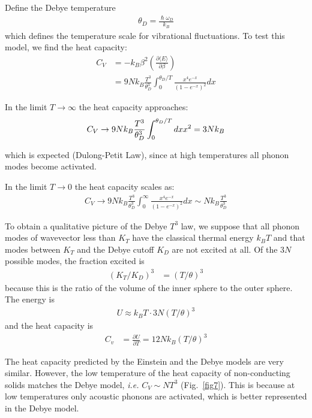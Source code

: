 \documentclass[book.tex]{subfiles}
\begin{document}
Define the Debye temperature 
\begin{align}
\theta_D = \frac{\hslash\omega_D}{k_B}
\end{align}
which defines the temperature scale for vibrational fluctuations. To test this model, we find the heat capacity:
\begin{align}
C_V &= -k_B\beta^2\left(\frac{\partial\langle E\rangle}{\partial\beta}\right) \\
&= 9Nk_B\frac{T^3}{\theta_D^3}\int_0^{\theta_D/T}\frac{x^4e^{-x}}{\left(1-e^{-x}\right)^2} dx 
\end{align}

In the limit $T \rightarrow \infty $ the heat capacity approaches:
\begin{align}
C_V \rightarrow 9Nk_B\frac{T^3}{\theta_D^3}\int_0^{\theta_D/T}dxx^2 = 3Nk_B \notag
\end{align}

\noindent which is expected (Dulong-Petit Law), since at high temperatures all phonon modes become activated.

In the limit $T \rightarrow 0 $ the heat capacity scales as:
\begin{align}
C_V \rightarrow 9Nk_B\frac{T^3}{\theta_D^3}\int_0^{\infty}\frac{x^4e^{-x}}{\left(1-e^{-x}\right)^2} dx \sim Nk_B\frac{T^3}{\theta_D^3}
\end{align}

To obtain a qualitative picture of the Debye $T^3$ law, we suppose that all phonon modes of wavevector less than $K_T$ have the classical thermal energy
$k_BT$ and that modes between $K_T$ and the Debye cutoff $K_D$ are not excited at all. Of the $3N$ possible modes, the fraction excited is 
\begin{align} 
(K_T/K_D)^3 &=(T/\theta)^3
\end{align}
because this is the ratio of the volume of the inner sphere to the outer sphere. The energy is 
\begin{align} 
U \approx k_BT \cdot 3N(T/\theta)^3
\end{align}
and the heat capacity is 
\begin{align} 
C_v &=\frac{\partial U}{\partial T} = 12Nk_B(T/\theta)^3
\end{align}


The heat capacity predicted by the Einstein and the Debye models are very similar. However, the low temperature of the heat capacity of non-conducting solids matches the Debye model, \textit{i.e.} $C_V \sim NT^3$ (Fig.~\ref{fig7}). This is because at low temperatures only acoustic phonons are activated, which is better represented in the Debye model.
\end{document}
